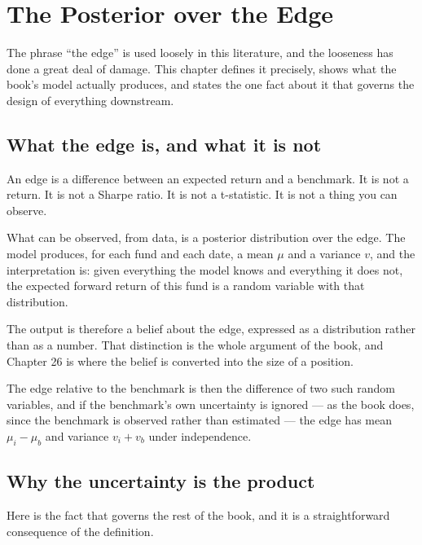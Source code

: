 
\chapter{The Posterior over the Edge}
\label{ch:posterior-edge}

The phrase ``the edge'' is used loosely in this literature, and the
looseness has done a great deal of damage. This chapter defines it
precisely, shows what the book's model actually produces, and states the
one fact about it that governs the design of everything downstream.

\section{What the edge is, and what it is not}

An edge is a difference between an expected return and a benchmark. It is
not a return. It is not a Sharpe ratio. It is not a t-statistic. It is not
a thing you can observe.

What can be observed, from data, is a posterior distribution over the
edge. The model produces, for each fund and each date, a mean \(\mu\) and
a variance \(v\), and the interpretation is: given everything the model
knows and everything it does not, the expected forward return of this fund
is a random variable with that distribution.

The output is therefore a belief about the edge, expressed as a
distribution rather than as a number. That distinction is the whole
argument of the book, and Chapter 26 is where the belief is converted into
the size of a position.

The edge relative to the benchmark is then the difference of two such
random variables, and if the benchmark's own uncertainty is ignored --- as
the book does, since the benchmark is observed rather than estimated ---
the edge has mean \(\mu_i - \mu_b\) and variance \(v_i + v_b\) under
independence.

\section{Why the uncertainty is the product}

Here is the fact that governs the rest of the book, and it is a
straightforward consequence of the definition.

